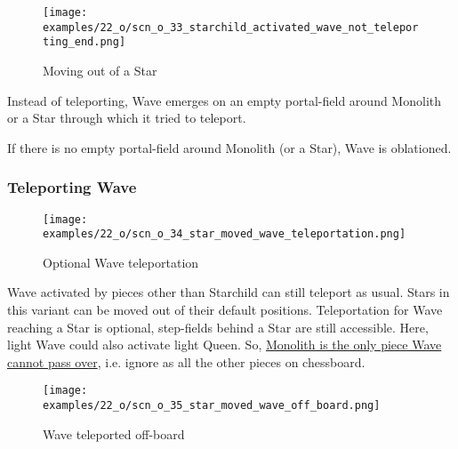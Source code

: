 \vspace*{5.7\baselineskip}
\noindent
\begin{wrapfigure}[7]{l}{0.4\textwidth}
\centering
\texttt{[image: examples/22\_o/scn\_o\_33\_starchild\_activated\_wave\_not\_teleporting\_end.png]}
\vspace*{-0.4\baselineskip}
\caption{Moving out of a Star}
\label{fig:scn_o_33_starchild_activated_wave_not_teleporting_end}
\end{wrapfigure}
Instead of teleporting, Wave emerges on an empty portal-field around Monolith or a
Star through which it tried to teleport.

If there is no empty portal-field around Monolith (or a Star), Wave is oblationed.

\clearpage %

\subsubsection*{Teleporting Wave}
\label{sec:One/Starchild/Activating Wave/Teleporting Wave}

\vspace*{-1.5\baselineskip}
\noindent
\begin{figure}[!h]
\texttt{[image: examples/22\_o/scn\_o\_34\_star\_moved\_wave\_teleportation.png]}
\vspace*{-1.4\baselineskip}
\caption{Optional Wave teleportation}
\label{fig:scn_o_34_star_moved_wave_teleportation}
\end{figure}

\vspace*{-0.5\baselineskip}
Wave activated by pieces other than Starchild can still teleport as usual. Stars
in this variant can be moved out of their default positions. Teleportation for
Wave reaching a Star is optional, step-fields behind a Star are still accessible.
Here, light Wave could also activate light Queen. So,
\hyperref[fig:scn_d_14_teleport_wave_via_monolith]{Monolith is the only piece Wave cannot pass over},
i.e. ignore as all the other pieces on chessboard.

\clearpage %

\vspace*{-2.1\baselineskip}
\noindent
\begin{figure}[!h]
\texttt{[image: examples/22\_o/scn\_o\_35\_star\_moved\_wave\_off\_board.png]}
\caption{Wave teleported off-board}
\label{fig:scn_o_35_star_moved_wave_off_board}
\end{figure}

